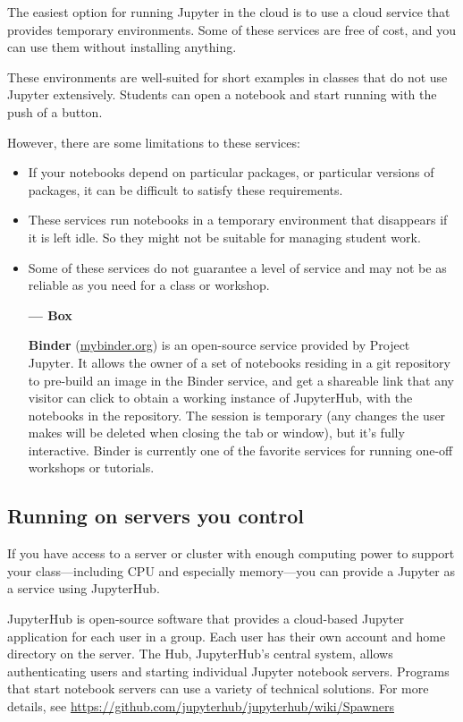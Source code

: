 \documentclass[]{book}
\begin{document}
The easiest option for running Jupyter in the cloud is to use a cloud
service that provides temporary environments. Some of these services are
free of cost, and you can use them without installing anything.

These environments are well-suited for short examples in classes that do
not use Jupyter extensively. Students can open a notebook and start
running with the push of a button.

However, there are some limitations to these services:

\begin{itemize}
\item
  If your notebooks depend on particular packages, or particular
  versions of packages, it can be difficult to satisfy these
  requirements.
\item
  These services run notebooks in a temporary environment that
  disappears if it is left idle. So they might not be suitable for
  managing student work.
\item
  Some of these services do not guarantee a level of service and may not
  be as reliable as you need for a class or workshop.

  \textbf{--- Box}

  \textbf{Binder} (\href{https://mybinder.org}{mybinder.org}) is an
  open-source service provided by Project Jupyter. It allows the owner
  of a set of notebooks residing in a git repository to pre-build an
  image in the Binder service, and get a shareable link that any visitor
  can click to obtain a working instance of JupyterHub, with the
  notebooks in the repository. The session is temporary (any changes the
  user makes will be deleted when closing the tab or window), but it's
  fully interactive. Binder is currently one of the favorite services
  for running one-off workshops or tutorials.
\end{itemize}

\subsection{Running on servers you
control}\label{running-on-servers-you-control}

If you have access to a server or cluster with enough computing power to
support your class---including CPU and especially memory---you can
provide a Jupyter as a service using JupyterHub.

JupyterHub is open-source software that provides a cloud-based Jupyter
application for each user in a group. Each user has their own account
and home directory on the server. The Hub, JupyterHub's central system,
allows authenticating users and starting individual Jupyter notebook
servers. Programs that start notebook servers can use a variety of
technical solutions. For more details, see
\url{https://github.com/jupyterhub/jupyterhub/wiki/Spawners}
\end{document}
